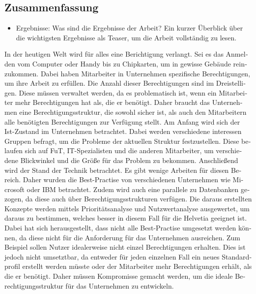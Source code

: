 \begin{otherlanguage}{ngerman}
	\chapter*{Zusammenfassung}
	\begin{itemize}
          \item Ergebnisse: Was sind die Ergebnisse der Arbeit? Ein kurzer Überblick über die wichtigsten Ergebnisse als Teaser, um die Arbeit vollständig zu lesen.
	\end{itemize}
In der heutigen Welt wird für alles eine Berichtigung verlangt.
Sei es das Anmelden vom Computer oder Handy bis zu Chipkarten, um in gewisse Gebäude reinzukommen.
Dabei haben Mitarbeiter in Unternehmen spezifische Berechtigungen, um ihre Arbeit zu erfüllen.
Die Anzahl dieser Berechtigungen sind im Dreistelligen.
Diese müssen verwaltet werden, da es problematisch ist, wenn ein Mitarbeiter mehr Berechtigungen hat als, die er benötigt.
Daher braucht das Unternehmen eine Berechtigungsstruktur, die sowohl sicher ist, als auch den Mitarbeitern alle benötigten Berechtigungen zur Verfügung stellt.
\newline
Am Anfang wird sich der Ist-Zustand im Unternehmen betrachtet.
Dabei werden verschiedene interessen Gruppen befragt, um die Probleme der aktuellen Struktur festzustellen.
Diese belaufen sich auf \ac{FuT}, IT-Spezialisten und die anderen Mitarbeiter, um verschiedene Blickwinkel und die Größe für das Problem zu bekommen.
Anschließend wird der Stand der Technik betrachtet.
Es gibt wenige Arbeiten für diesen Bereich.
Daher wurden die Best-Practise von verschiedenen Unternehmen wie Microsoft oder IBM betrachtet.
Zudem wird auch eine parallele zu Datenbanken gezogen, da diese auch über Berechtigungsstrukturen verfügen.
Die daraus erstellten Konzepte werden mittels Prioritätsanalyse und Nutzwertanalyse ausgewertet, um daraus zu bestimmen, welches besser in diesem Fall für die Helvetia geeignet ist.
\newline
Dabei hat sich herausgestellt, dass nicht alle Best-Practise umgesetzt werden können, da diese nicht für die Anforderung für das Unternehmen ausreichen.
Zum Beispiel sollen Nutzer idealerweise nicht einzel Berechtigungen erhalten.
Dies ist jedoch nicht umsetztbar, da entweder für jeden einzelnen Fall ein neues Standardprofil erstellt werden müsste oder der Mitarbeiter mehr Berechtigungen erhält, als die er benötigt.
Daher müssen Kompromisse gemacht werden, um die ideale Berechtigungsstruktur für das Unternehmen zu entwickeln.
\end{otherlanguage}
